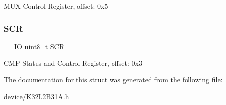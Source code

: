 M\+UX Control Register, offset\+: 0x5 \mbox{\label{struct_c_m_p___type_a3fa18be8bc25b11eff5d36fbad087a91}} 
\subsubsection{\texorpdfstring{SCR}{SCR}}
{\footnotesize\ttfamily \mbox{\hyperlink{core__cm0plus_8h_aec43007d9998a0a0e01faede4133d6be}{\+\_\+\+\_\+\+IO}} uint8\+\_\+t S\+CR}

C\+MP Status and Control Register, offset\+: 0x3 

The documentation for this struct was generated from the following file\+:\begin{DoxyCompactItemize}
\item 
device/\mbox{\hyperlink{_k32_l2_b31_a_8h}{K32\+L2\+B31\+A.\+h}}\end{DoxyCompactItemize}
